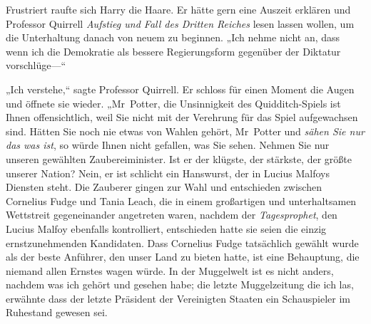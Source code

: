 Frustriert raufte sich Harry die Haare. Er hätte gern eine Auszeit erklären und Professor Quirrell \emph{Aufstieg und Fall des Dritten Reiches} lesen lassen wollen, um die Unterhaltung danach von neuem zu beginnen. „Ich nehme nicht an, dass wenn ich die Demokratie als bessere Regierungsform gegenüber der Diktatur vorschlüge—“

„Ich verstehe,“ sagte Professor Quirrell. Er schloss für einen Moment die Augen und öffnete sie wieder. „Mr~Potter, die Unsinnigkeit des Quidditch-Spiels ist Ihnen offensichtlich, weil Sie nicht mit der Verehrung für das Spiel aufgewachsen sind. Hätten Sie noch nie etwas von Wahlen gehört, Mr~Potter und \emph{sähen Sie nur das was ist}, so würde Ihnen nicht gefallen, was Sie sehen. Nehmen Sie nur unseren gewählten Zaubereiminister. Ist er der klügste, der stärkste, der größte unserer Nation? Nein, er ist schlicht ein Hanswurst, der in Lucius Malfoys Diensten steht. Die Zauberer gingen zur Wahl und entschieden zwischen Cornelius Fudge und Tania Leach, die in einem großartigen und unterhaltsamen Wettstreit gegeneinander angetreten waren, nachdem der \emph{Tagesprophet}, den Lucius Malfoy ebenfalls kontrolliert, entschieden hatte sie seien die einzig ernstzunehmenden Kandidaten. Dass Cornelius Fudge tatsächlich gewählt wurde als der beste Anführer, den unser Land zu bieten hatte, ist eine Behauptung, die niemand allen Ernstes wagen würde. In der Muggelwelt ist es nicht anders, nachdem was ich gehört und gesehen habe; die letzte Muggelzeitung die ich las, erwähnte dass der letzte Präsident der Vereinigten Staaten ein Schauspieler im Ruhestand gewesen sei.
